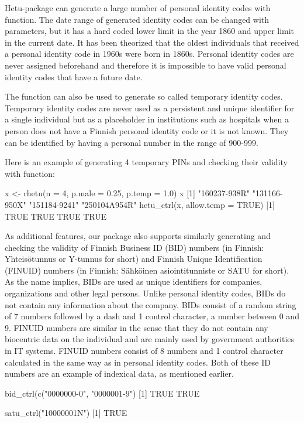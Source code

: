 Hetu-package can generate a large number of personal identity codes with  function. The date range of generated identity codes can be changed with parameters, but it has a hard coded lower limit in the year 1860 and upper limit in the current date. It has been theorized that the oldest individuals that received a personal identity code in 1960s were born in 1860s. Personal identity codes are never assigned beforehand and therefore it is impossible to have valid personal identity codes that have a future date. 

The function can also be used to generate so called temporary identity codes. Temporary identity codes are never used as a persistent and unique identifier for a single individual but as a placeholder in institutions such as hospitals when a person does not have a Finnish personal identity code or it is not known. They can be identified by having a personal number in the range of 900-999.

Here is an example of generating 4 temporary PINs and checking their validity with  function:

\begin{example}
  x <- rhetu(n = 4, p.male = 0.25, p.temp = 1.0)
  x
  [1] "160237-938R" "131166-950X" "151184-9241" "250104A954R"
  hetu_ctrl(x, allow.temp = TRUE)
  [1] TRUE TRUE TRUE TRUE
\end{example}

As additional features, our package also supports similarly generating and checking the validity of Finnish Business ID (BID) numbers (in Finnish: Yhteisötunnus or Y-tunnus for short) and Finnish Unique Identification (FINUID) numbers (in Finnish: Sähköinen asiointitunniste or SATU for short). As the name implies, BIDs are used as unique identifiers for companies, organizations and other legal persons. Unlike personal identity codes, BIDs do not contain any information about the company. BIDs consist of a random string of 7 numbers followed by a dash and 1 control character, a number between 0 and 9. FINUID numbers are similar in the sense that they do not contain any biocentric data on the individual and are mainly used by government authorities in IT systems. FINUID numbers consist of 8 numbers and 1 control character calculated in the same way as in personal identity codes. Both of these ID numbers are an example of indexical data, as mentioned earlier.

\begin{example}
  bid_ctrl(c("0000000-0", "0000001-9")
  [1] TRUE TRUE
  
  satu_ctrl("10000001N")
  [1] TRUE
\end{example}

